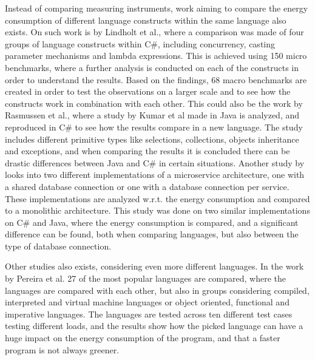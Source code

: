 Instead of comparing measuring instruments, work aiming to compare the energy consumption of different language constructs within the same language also exists. On such work is by Lindholt et al.\cite[]{Lindholt2022}, where a comparison was made of four groups of language constructs within C\#, including concurrency, casting parameter mechanisms and lambda expressions. This is achieved using 150 micro benchmarks, where a further analysis is conducted on each of the constructs in order to understand the results. Based on the findings, 68 macro benchmarks are created in order to test the observations on a larger scale and to see how the constructs work in combination with each other. This could also be the work by Rasmussen et al.\cite[]{Rasmussen2021}, where a study by Kumar et al\cite[]{Kumar2017} made in Java is analyzed, and reproduced in C\# to see how the results compare in a new language. The study includes different primitive types like selections, collections, objects inheritance and exceptions, and when comparing the results it is concluded there can be drastic differences between Java and C\# in certain situations. Another study by \cite[]{Theilmann2022} looks into two different implementations of a microservice architecture, one with a shared database connection or one with a database connection per service. These implementations are analyzed w.r.t. the energy consumption and compared to a monolithic architecture. This study was done on two similar implementations on C\# and Java, where the energy consumption is compared, and a significant difference can be found, both when comparing languages, but also between the type of database connection.

Other studies also exists, considering even more different languages. In the work by Pereira et al.\cite[]{Pereira2017} 27 of the most popular languages are compared, where the languages are compared with each other, but also in groups considering compiled, interpreted and virtual machine languages or object oriented, functional and imperative languages. The languages are tested across ten different test cases testing different loads, and the results show how the picked language can have a huge impact on the energy consumption of the program, and that a faster program is not always greener.

